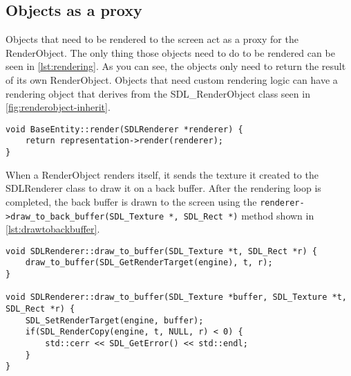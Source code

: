 \subsection{Objects as a proxy}
\label{sec:rendering-proxy}

Objects that need to be rendered to the screen act as a proxy for the 
RenderObject. The only thing those objects need to do to be rendered can be 
seen in \cref{lst:rendering}. As you can see, the objects only need to return 
the result of its own RenderObject. Objects that need custom rendering logic 
can have a rendering object that derives from the SDL\_RenderObject class seen 
in \cref{fig:renderobject-inherit}.
\\
\begin{lstlisting}[caption={Rendering proxy.},label={lst:rendering}]
void BaseEntity::render(SDLRenderer *renderer) {
    return representation->render(renderer);
}
\end{lstlisting}

When a RenderObject renders itself, it sends the texture it created to the 
SDLRenderer class to draw it on a back buffer. After the rendering loop is 
completed, the back buffer is drawn to the screen using the 
\lstinline{renderer->draw_to_back_buffer(SDL_Texture *, SDL_Rect *)} 
method shown in \cref{lst:drawtobackbuffer}.
\\

\begin{lstlisting}[caption={Drawing to the back buffer.},
label={lst:drawtobackbuffer}]
void SDLRenderer::draw_to_buffer(SDL_Texture *t, SDL_Rect *r) {
    draw_to_buffer(SDL_GetRenderTarget(engine), t, r);
}

void SDLRenderer::draw_to_buffer(SDL_Texture *buffer, SDL_Texture *t, SDL_Rect *r) {
    SDL_SetRenderTarget(engine, buffer);
    if(SDL_RenderCopy(engine, t, NULL, r) < 0) {
        std::cerr << SDL_GetError() << std::endl;
    }
}
\end{lstlisting}
